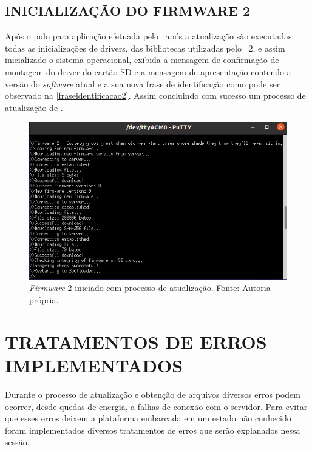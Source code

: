 \subsection{INICIALIZAÇÃO DO FIRMWARE 2}
Após o pulo para aplicação efetuada pelo \bootloader\ após a atualização são executadas todas as inicializações de drivers, das bibliotecas utilizadas pelo \firmware\ 2, e assim inicializado o sistema operacional, exibida a mensagem de confirmação de montagem do driver do cartão SD e a mensagem de apresentação contendo a versão do \textit{software} atual e a sua nova frase de identificação como pode ser observado na \autoref{fraseidentificacao2}. Assim concluindo com sucesso um processo de atualização de \firmware.

\begin{figure}[H]
    \scriptsize
     \centering
     \includegraphics[scale=0.9]{dados/figuras/Firmware2.png}
     \caption{\textit{Firmware} 2 iniciado com processo de atualização. \newline Fonte: Autoria própria.}
     \label{fraseidentificacao2}
\end{figure}

\section{TRATAMENTOS DE ERROS IMPLEMENTADOS}
Durante o processo de atualização e obtenção de arquivos diversos erros podem ocorrer, desde quedas de energia, a falhas de conexão com o servidor. Para evitar que esses erros deixem a plataforma embarcada em um estado não conhecido foram implementados diversos tratamentos de erros que serão explanados nessa sessão.
